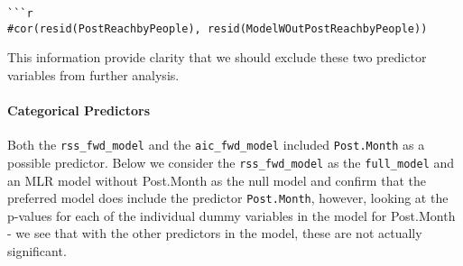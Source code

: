 \documentclass[
]{article}
\newenvironment{Shaded}{\begin{snugshade}}{\end{snugshade}}
\newcommand{\DataTypeTok}[1]{\textcolor[rgb]{0.13,0.29,0.53}{#1}}
\newcommand{\DecValTok}[1]{\textcolor[rgb]{0.00,0.00,0.81}{#1}}
\newcommand{\KeywordTok}[1]{\textcolor[rgb]{0.13,0.29,0.53}{\textbf{#1}}}
\newcommand{\NormalTok}[1]{#1}
\newcommand{\OperatorTok}[1]{\textcolor[rgb]{0.81,0.36,0.00}{\textbf{#1}}}
\newcommand{\StringTok}[1]{\textcolor[rgb]{0.31,0.60,0.02}{#1}}
\begin{document}
\begin{verbatim}



```r
#cor(resid(PostReachbyPeople), resid(ModelWOutPostReachbyPeople))
\end{verbatim}

This information provide clarity that we should exclude these two
predictor variables from further analysis.

\hypertarget{categorical-predictors}{%
\paragraph{Categorical Predictors}\label{categorical-predictors}}

Both the \texttt{rss\_fwd\_model} and the \texttt{aic\_fwd\_model}
included \texttt{Post.Month} as a possible predictor. Below we consider
the \texttt{rss\_fwd\_model} as the \texttt{full\_model} and an MLR
model without Post.Month as the null model and confirm that the
preferred model does include the predictor \texttt{Post.Month}, however,
looking at the p-values for each of the individual dummy variables in
the model for Post.Month - we see that with the other predictors in the
model, these are not actually significant.

\begin{Shaded}
\end{Shaded}
\end{document}
